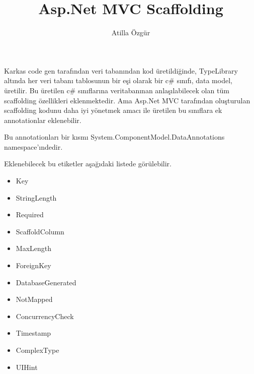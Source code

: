 \documentclass[10pt,a4paper]{article}
\newcommand{\authorName}{Atilla \"Ozg\"ur}
\newcommand{\titleName}{Asp.Net MVC Scaffolding}
\begin{document}
\author{\authorName}
\title{\titleName}

\maketitle


\maketitle



Karkas code gen tarafından veri tabanından kod üretildiğinde,
TypeLibrary altında her veri tabanı tablosunun bir eşi olarak
bir c\# sınıfı, data model, üretilir. 
Bu üretilen c\# sınıflarına veritabanınan anlaşılabilecek olan
tüm scaffolding özellikleri eklenmektedir.
Ama Asp.Net MVC tarafından oluşturulan scaffolding kodunu
daha iyi yönetmek amacı ile üretilen
bu sınıflara ek annotationlar eklenebilir.

Bu annotationları bir kısmı System.ComponentModel.DataAnnotations namespace'ındedir.



Eklenebilecek bu etiketler aşağıdaki listede \cite{Litwin2012} görülebilir.



\begin{itemize}

\item  Key

\item  StringLength

\item  Required

\item ScaffoldColumn

\item  MaxLength

\item ForeignKey

\item DatabaseGenerated

\item  NotMapped


\item  ConcurrencyCheck


\item  Timestamp

\item  ComplexType

\item  UIHint

\end{itemize}
\end{document}
